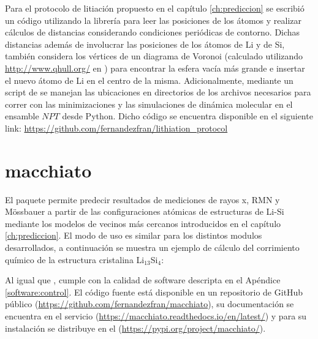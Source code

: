 Para el protocolo de litiación propuesto en el capítulo \ref{ch:prediccion}
se escribió un código utilizando la librería  
\cite{mdanalysis1, mdanalysis2} para leer las posiciones de los átomos y realizar 
cálculos de distancias considerando condiciones periódicas de contorno. Dichas 
distancias además de involucrar las posiciones de los átomos de Li y de Si, 
también considera los vértices de un diagrama de Voronoi (calculado 
utilizando \url{http://www.qhull.org/} en  \cite{scipy}) para 
encontrar la esfera vacía más grande e insertar el nuevo átomo de Li en el centro
de la misma. Adicionalmente, mediante un script de  se manejan las 
ubicaciones en directorios de los archivos necesarios para correr con 
 \cite{dftb+} las minimizaciones y las simulaciones de dinámica 
molecular en el ensamble $NPT$ desde Python. Dicho código se encuentra disponible
en el siguiente link: \url{https://github.com/fernandezfran/lithiation\_protocol}

\section{macchiato}\label{software:macchiato}

El paquete  permite predecir resultados de mediciones de rayos x, 
RMN y Mössbauer a partir de las configuraciones atómicas de estructuras de Li-Si
mediante los modelos de vecinos más cercanos introducidos en el capítulo 
\ref{ch:prediccion}. El modo de uso es similar para los distintos modulos
desarrollados, a continuación se muestra un ejemplo de cálculo del corrimiento 
químico de la estructura cristalina Li$_{13}$Si$_{4}$:



Al igual que ,  cumple con la calidad de 
software descripta en el Apéndice \ref{software:control}. El código fuente está 
disponible en un repositorio de GitHub público
(\url{https://github.com/fernandezfran/macchiato}), su documentación se encuentra
en el servicio 
(\url{https://macchiato.readthedocs.io/en/latest/}) y para su instalación se 
distribuye en el   
(\url{https://pypi.org/project/macchiato/}).
